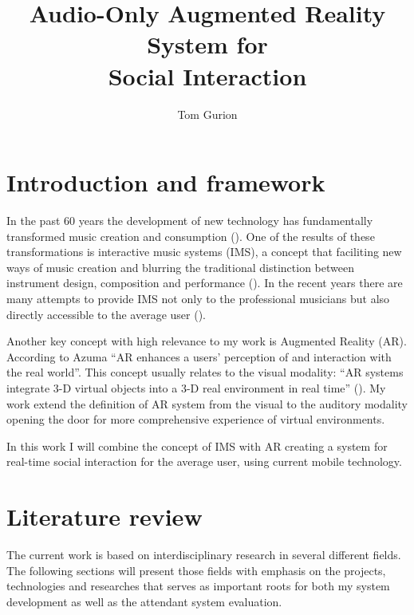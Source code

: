 \documentclass[a4paper,11pt]{article}
\title{Audio-Only Augmented Reality System for\\Social Interaction}
\author{Tom Gurion}
\newcommand{\noriinline}[1]{\todo[author=Nori,inline,color=green]{#1}}
\begin{document}
\maketitle

\listoftodos


\section{Introduction and framework}

In the past 60 years the development of new technology has fundamentally transformed music creation and consumption (\cite{hargreaves99}).
One of the results of these transformations is interactive music systems (IMS), a concept that faciliting new ways of music creation and blurring the traditional distinction between instrument design, composition and performance (\cite{drummond09}).
In the recent years there are many attempts to provide IMS not only to the professional musicians but also directly accessible to the average user (\cite{stimulant13}).


Another key concept with high relevance to my work is Augmented Reality (AR).
According to Azuma ``AR enhances a users' perception of and interaction with the real world''.
This concept usually relates to the visual modality: ``AR systems integrate 3-D virtual objects into a 3-D real environment in real time'' (\cite{azuma97}).
My work extend the definition of AR system from the visual to the auditory modality opening the door for more comprehensive experience of virtual environments.

In this work I will combine the concept of IMS with AR creating a system for real-time social interaction for the average user, using current mobile technology.

\section{Literature review}


The current work is based on interdisciplinary research in several different fields.
The following sections will present those fields with emphasis on the projects, technologies and researches that serves as important roots for both my system development as well as the attendant system evaluation.
\end{document}
